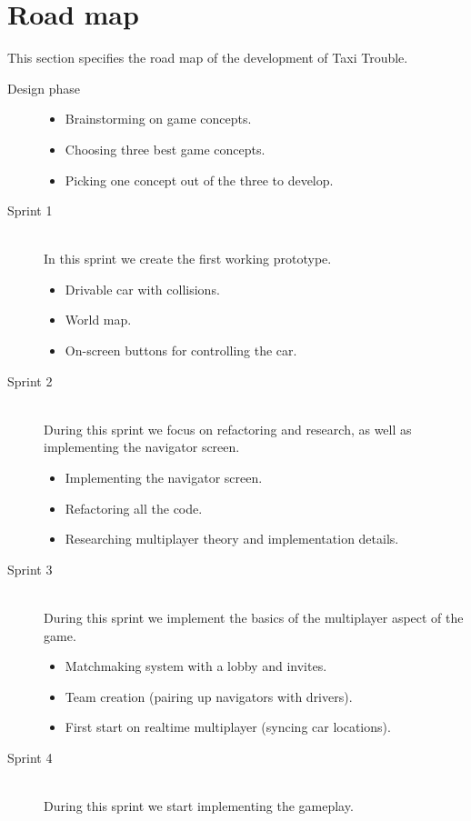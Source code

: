 \documentclass{article}
\begin{document}
\section{Road map}
This section specifies the road map of the development of Taxi Trouble.
\begin{description}
\item[Design phase] \hfill
\begin{itemize}
\item Brainstorming on game concepts.
\item Choosing three best game concepts.
\item Picking one concept out of the three to develop.
\end{itemize}
\item[Sprint 1] \hfill \\
In this sprint we create the first working prototype.
\begin{itemize}
\item Drivable car with collisions.
\item World map.
\item On-screen buttons for controlling the car.
\end{itemize}
\item[Sprint 2] \hfill \\
During this sprint we focus on refactoring and research, as well as implementing the navigator screen.
\begin{itemize}
\item Implementing the navigator screen.
\item Refactoring all the code.
\item Researching multiplayer theory and implementation details.
\end{itemize}
\item[Sprint 3] \hfill \\
During this sprint we implement the basics of the multiplayer aspect of the game.
\begin{itemize}
\item Matchmaking system with a lobby and invites.
\item Team creation (pairing up navigators with drivers).
\item First start on realtime multiplayer (syncing car locations).
\end{itemize}
\item[Sprint 4] \hfill \\
During this sprint we start implementing the gameplay.
\begin{itemize}

\end{itemize}
\end{description}
\end{document}
